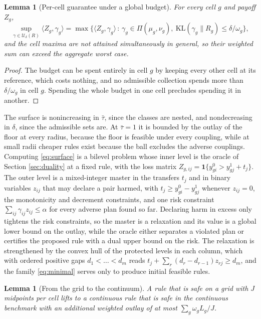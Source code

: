 \documentclass[11pt,a4paper]{article}
\theoremstyle{notesplain}
\newtheorem{lemma}[theorem]{Lemma}
\theoremstyle{notesupright}
\numberwithin{equation}{section}
\newcommand{\KL}{\mathrm{KL}}
\begin{document}
\begin{lemma}[Per-cell guarantee under a global budget]
\label{lem:percell}
For every cell $g$ and payoff $Z_g$,
\begin{equation}
\sup_{\gamma\in\mathcal U_\delta(R)}\langle Z_g,\gamma_g\rangle=\max\big\{\langle Z_g,\gamma_g\rangle\,:\,\gamma_g\in\Pi(\mu_g,\nu_g),\ \KL(\gamma_g\|R_g)\le\delta/\omega_g\big\},
\end{equation}
and the cell maxima are not attained simultaneously in general, so their weighted sum can exceed the aggregate worst case.
\end{lemma}

\begin{proof}
The budget can be spent entirely in cell $g$ by keeping every other cell at its reference, which costs nothing, and no admissible collection spends more than $\delta/\omega_g$ in cell $g$. Spending the whole budget in one cell precludes spending it in another.
\end{proof}

The surface is nonincreasing in $\bar\tau$, since the classes are nested, and nondecreasing in $\delta$, since the admissible sets are. At $\bar\tau=1$ it is bounded by the outlay of the floor at every radius, because the floor is feasible under every coupling, while at small radii cheaper rules exist because the ball excludes the adverse couplings. Computing \eqref{eq:surface} is a bilevel problem whose inner level is the oracle of Section \ref{sec:duality} at a fixed rule, with the loss matrix $Z_{g,ij}=\mathbf 1\{y^0_{gi}>y^1_{gj}+t_j\}$. The outer level is a mixed-integer master in the transfers $t_j$ and in binary variables $z_{ij}$ that may declare a pair harmed, with $t_j\ge y^0_{gi}-y^1_{gj}$ whenever $z_{ij}=0$, the monotonicity and decrement constraints, and one risk constraint $\sum_{ij}\gamma_{ij}z_{ij}\le\alpha$ for every adverse plan found so far. Declaring harm in excess only tightens the risk constraints, so the master is a relaxation and its value is a global lower bound on the outlay, while the oracle either separates a violated plan or certifies the proposed rule with a dual upper bound on the risk. The relaxation is strengthened by the convex hull of the protected levels in each column, which with ordered positive gaps $d_1<\dots<d_m$ reads $t_j+\sum_r(d_r-d_{r-1})z_{rj}\ge d_m$, and the family \eqref{eq:minimal} serves only to produce initial feasible rules.

\begin{lemma}[From the grid to the continuum]
\label{lem:lifting}
A rule that is safe on a grid with $J$ midpoints per cell lifts to a continuous rule that is safe in the continuous benchmark with an additional weighted outlay of at most $\sum_g\omega_gL_g/J$.
\end{lemma}
\end{document}
